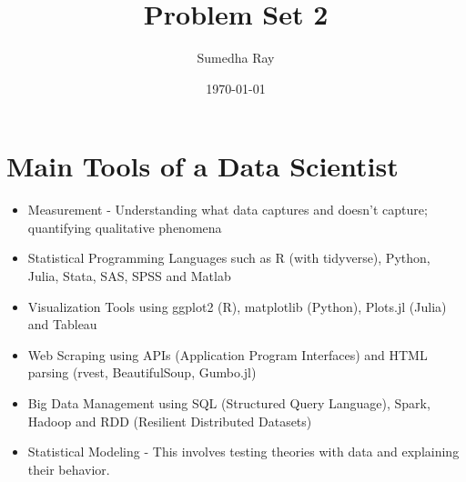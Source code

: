 \documentclass{article}
\begin{document}
\title{Problem Set 2}
\author{Sumedha Ray}
\date{\today}
\maketitle

\section*{Main Tools of a Data Scientist}

\begin{itemize}
    \item Measurement - Understanding what data captures and doesn't capture; quantifying qualitative phenomena
    
    \item Statistical Programming Languages such as R (with tidyverse), Python, Julia, Stata, SAS, SPSS and Matlab

    \item Visualization Tools using ggplot2 (R), matplotlib (Python), Plots.jl (Julia) and Tableau

    \item Web Scraping using APIs (Application Program Interfaces) and HTML parsing (rvest, BeautifulSoup, Gumbo.jl)

    \item Big Data Management using SQL (Structured Query Language), Spark, Hadoop and RDD (Resilient Distributed Datasets)
    
    \item Statistical Modeling - This involves testing theories with data and explaining their behavior. 

\end{itemize}
\end{document}

